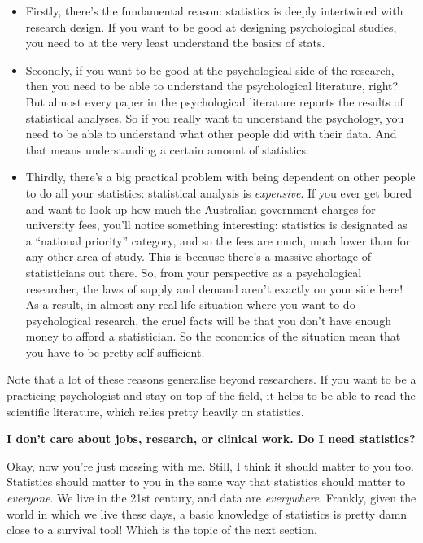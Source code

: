 \documentclass[
  letterpaper,
]{book}
\providecommand{\tightlist}{%
  \setlength{\itemsep}{0pt}\setlength{\parskip}{0pt}}\usepackage{longtable,booktabs,array}
\begin{document}
\begin{itemize}
\tightlist
\item
  Firstly, there's the fundamental reason: statistics is deeply
  intertwined with research design. If you want to be good at designing
  psychological studies, you need to at the very least understand the
  basics of stats.
\item
  Secondly, if you want to be good at the psychological side of the
  research, then you need to be able to understand the psychological
  literature, right? But almost every paper in the psychological
  literature reports the results of statistical analyses. So if you
  really want to understand the psychology, you need to be able to
  understand what other people did with their data. And that means
  understanding a certain amount of statistics.
\item
  Thirdly, there's a big practical problem with being dependent on other
  people to do all your statistics: statistical analysis is
  \emph{expensive}. If you ever get bored and want to look up how much
  the Australian government charges for university fees, you'll notice
  something interesting: statistics is designated as a ``national
  priority'' category, and so the fees are much, much lower than for any
  other area of study. This is because there's a massive shortage of
  statisticians out there. So, from your perspective as a psychological
  researcher, the laws of supply and demand aren't exactly on your side
  here! As a result, in almost any real life situation where you want to
  do psychological research, the cruel facts will be that you don't have
  enough money to afford a statistician. So the economics of the
  situation mean that you have to be pretty self-sufficient.
\end{itemize}

Note that a lot of these reasons generalise beyond researchers. If you
want to be a practicing psychologist and stay on top of the field, it
helps to be able to read the scientific literature, which relies pretty
heavily on statistics.

\textbf{I don't care about jobs, research, or clinical work. Do I need
statistics?}

Okay, now you're just messing with me. Still, I think it should matter
to you too. Statistics should matter to you in the same way that
statistics should matter to \emph{everyone}. We live in the 21st
century, and data are \emph{everywhere}. Frankly, given the world in
which we live these days, a basic knowledge of statistics is pretty damn
close to a survival tool! Which is the topic of the next section.
\end{document}

